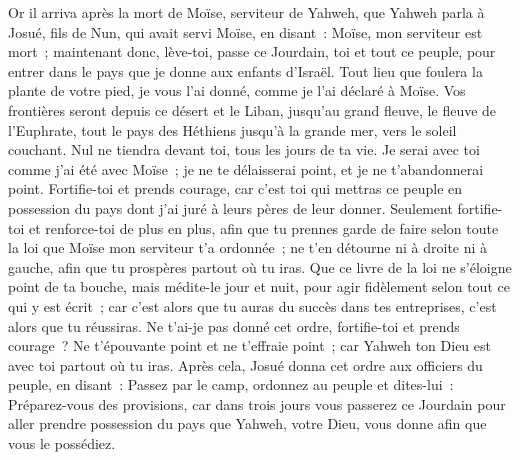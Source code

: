 \begin{multicols}{2}
\VerseOne{}Or il arriva après la mort de Moïse, serviteur de Yahweh, que Yahweh parla à Josué, fils de Nun, qui avait servi Moïse, en disant~:
Moïse, mon serviteur est mort~; maintenant donc, lève-toi, passe ce Jourdain, toi et tout ce peuple, pour entrer dans le pays que je donne aux enfants d'Israël.
Tout lieu que foulera la plante de votre pied, je vous l'ai donné, comme je l'ai déclaré à Moïse.
Vos frontières seront depuis ce désert et le Liban, jusqu'au grand fleuve, le fleuve de l'Euphrate, tout le pays des Héthiens jusqu'à la grande mer, vers le soleil couchant.
Nul ne tiendra devant toi, tous les jours de ta vie. Je serai avec toi comme j'ai été avec Moïse~; je ne te délaisserai point, et je ne t'abandonnerai point.
Fortifie-toi et prends courage, car c'est toi qui mettras ce peuple en possession du pays dont j'ai juré à leurs pères de leur donner.
Seulement fortifie-toi et renforce-toi de plus en plus, afin que tu prennes garde de faire selon toute la loi que Moïse mon serviteur t'a ordonnée~; ne t'en détourne ni à droite ni à gauche, afin que tu prospères partout où tu iras.
Que ce livre de la loi ne s'éloigne point de ta bouche, mais médite-le jour et nuit, pour agir fidèlement selon tout ce qui y est écrit~; car c'est alors que tu auras du succès dans tes entreprises, c'est alors que tu réussiras.
Ne t'ai-je pas donné cet ordre, fortifie-toi et prends courage~? Ne t'épouvante point et ne t'effraie point~; car Yahweh ton Dieu est avec toi partout où tu iras.
Après cela, Josué donna cet ordre aux officiers du peuple, en disant~:
Passez par le camp, ordonnez au peuple et dites-lui~: Préparez-vous des provisions, car dans trois jours vous passerez ce Jourdain pour aller prendre possession du pays que Yahweh, votre Dieu, vous donne afin que vous le possédiez.

\end{multicols}
